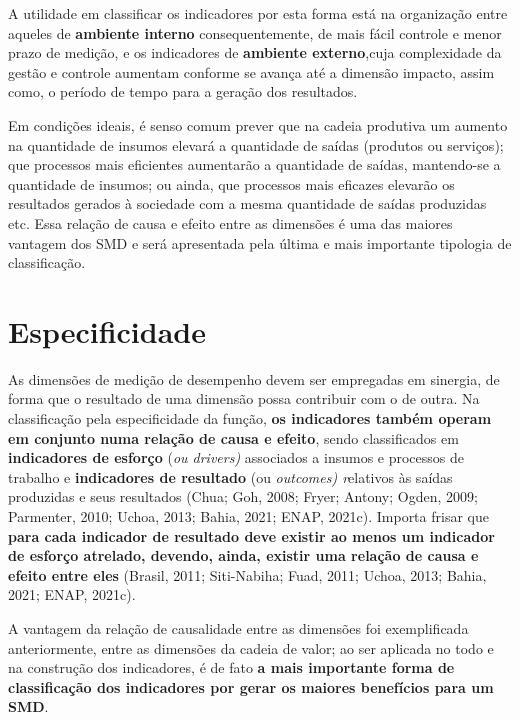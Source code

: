 \documentclass[
  letterpaper,
  DIV=11,
  numbers=noendperiod]{scrreprt}
\begin{document}
A utilidade em classificar os indicadores por esta forma está na
organização entre aqueles de \textbf{ambiente interno} consequentemente,
de mais fácil controle e menor prazo de medição, e os indicadores de
\textbf{ambiente externo},cuja complexidade da gestão e controle
aumentam conforme se avança até a dimensão impacto, assim como, o
período de tempo para a geração dos resultados.

Em condições ideais, é senso comum prever que na cadeia produtiva um
aumento na quantidade de insumos elevará a quantidade de saídas
(produtos ou serviços); que processos mais eficientes aumentarão a
quantidade de saídas, mantendo-se a quantidade de insumos; ou ainda, que
processos mais eficazes elevarão os resultados gerados à sociedade com a
mesma quantidade de saídas produzidas etc. Essa relação de causa e
efeito entre as dimensões é uma das maiores vantagem dos SMD e será
apresentada pela última e mais importante tipologia de classificação.

\hypertarget{especificidade}{%
\section{Especificidade}\label{especificidade}}

As dimensões de medição de desempenho devem ser empregadas em sinergia,
de forma que o resultado de uma dimensão possa contribuir com o de
outra. Na classificação pela especificidade da função, \textbf{os
indicadores também operam em conjunto numa relação de causa e efeito},
sendo classificados em \textbf{indicadores de esforço} (\emph{ou
drivers)} associados a insumos e processos de trabalho e
\textbf{indicadores de resultado} (ou \emph{outcomes) r}elativos às
saídas produzidas e seus resultados (Chua; Goh, 2008; Fryer; Antony;
Ogden, 2009; Parmenter, 2010; Uchoa, 2013; Bahia, 2021; ENAP, 2021c).
Importa frisar que \textbf{para cada indicador de resultado deve existir
ao menos um indicador de esforço atrelado, devendo, ainda, existir uma
relação de causa e efeito entre eles} (Brasil, 2011; Siti-Nabiha; Fuad,
2011; Uchoa, 2013; Bahia, 2021; ENAP, 2021c).

A vantagem da relação de causalidade entre as dimensões foi
exemplificada anteriormente, entre as dimensões da cadeia de valor; ao
ser aplicada no todo e na construção dos indicadores, é de fato
\textbf{a mais importante forma de classificação dos indicadores por
gerar os maiores benefícios para um SMD}.
\end{document}

